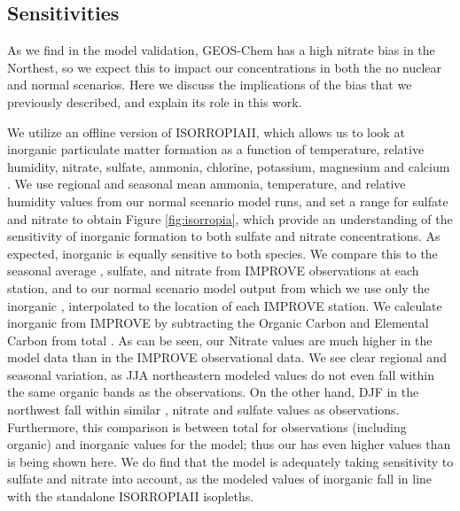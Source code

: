 \documentclass[12]{article}
\begin{document}
\subsection{ Sensitivities}
As we find in the model validation, GEOS-Chem has a high nitrate bias in the Northest, so we expect this to impact our  concentrations in both the no nuclear and normal scenarios. Here we discuss the implications of the bias that we previously described, and explain its role in this work.

We utilize an offline version of ISORROPIAII, which allows us to look at inorganic particulate matter formation as a function of temperature, relative humidity, nitrate, sulfate, ammonia, chlorine, potassium, magnesium and calcium \citep{fountoukis_isorropia_2007}. We use regional and seasonal mean ammonia, temperature, and relative humidity values from our normal scenario model runs, and set a range for sulfate and nitrate to obtain Figure \ref{fig:isorropia}, which provide an understanding of the sensitivity of inorganic  formation to both sulfate and nitrate concentrations. As expected, inorganic  is equally sensitive to both species. We compare this to the seasonal average , sulfate, and nitrate from IMPROVE observations at each station, and to our normal scenario model output from which we use only the inorganic , interpolated to the location of each IMPROVE station. We calculate inorganic  from IMPROVE by subtracting the Organic Carbon and Elemental Carbon from total . As can be seen, our Nitrate values are much higher in the model data than in the IMPROVE observational data. We see clear regional and seasonal variation, as JJA northeastern modeled values do not even fall within the same organic  bands as the observations. On the other hand, DJF in the northwest fall within similar , nitrate and sulfate values as observations. Furthermore, this comparison is between total  for observations (including organic) and inorganic  values for the model; thus our  has even higher values than is being shown here. We do find that the model is adequately taking sensitivity to sulfate and nitrate into account, as the modeled values of inorganic  fall in line with the standalone ISORROPIAII isopleths.
\end{document}
